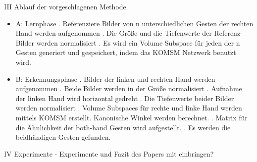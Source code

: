 III Ablauf der vorgeschlagenen Methode
\begin{itemize}
\item A: Lernphase
. Referenziere Bilder von n unterschiedlichen Gesten der rechten Hand werden aufgenommen
. Die Größe und die Tiefenwerte der Referenz-Bilder werden normalisiert
. Es wird ein Volume Subspace für jeden der n Gesten generiert und gespeichert, indem das KOMSM Netzwerk benutzt wird. 
\item B: Erkennungsphase
. Bilder der linken und rechten Hand werden aufgenommen
. Beide Bilder werden in der Größe normalisiert
. Aufnahme der linken Hand wird horizontal gedreht
. Die Tiefenwerte beider Bilder werden normalisiert
. Volume Subspaces für rechte und linke Hand werden mittels KOMSM erstellt. Kanonische Winkel werden berechnet. 
. Matrix für die Ähnlichkeit der both-hand Gesten wird aufgestellt.
. Es werden die beidhändigen Gesten gefunden. 
\end{itemize}
IV Experimente
- Experimente und Fazit des Papers mit einbringen?\newline
